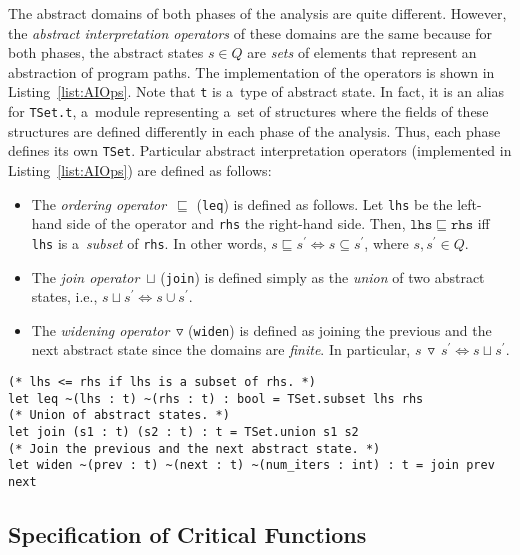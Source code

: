 The abstract domains of both phases of the analysis are quite different. However, the \emph{abstract interpretation operators} of these domains are the same because for both phases, the abstract states $ s \in Q $ are \emph{sets} of elements that represent an abstraction of program paths. The implementation of the operators is shown in Listing~\ref{list:AIOps}. Note that \texttt{t} is a~type of abstract state. In fact, it is an alias for \texttt{TSet.t}, a~module representing a~set of structures where the fields of these structures are defined differently in each phase of the analysis. Thus, each phase defines its own \texttt{TSet}. Particular abstract interpretation operators (implemented in Listing~\ref{list:AIOps}) are defined as follows:
\begin{itemize}
    \item The \emph{ordering operator}~$ \sqsubseteq $ (\texttt{leq}) is defined as follows. Let \texttt{lhs} be the left-hand side of the operator and \texttt{rhs} the right-hand side. Then, $ \mathtt{lhs} \sqsubseteq \mathtt{rhs} $ iff \texttt{lhs} is a~\emph{subset} of \texttt{rhs}. In other words, $ s \sqsubseteq s^\prime \Longleftrightarrow s \subseteq s^\prime $, where $ s, s^\prime \in Q $.

    \item The \emph{join operator}~$ \sqcup $ (\texttt{join}) is defined simply as the \emph{union} of two abstract states, i.e., $ s \sqcup s^\prime \Longleftrightarrow s \cup s^\prime $.

    \item The \emph{widening operator}~$ \triangledown $ (\texttt{widen}) is defined as joining the previous and the next abstract state since the domains are \emph{finite}. In particular, $ s\,\triangledown\,s^\prime \Longleftrightarrow s \sqcup s^\prime $.
\end{itemize}

\begin{lstlisting}[style=ocaml, label={list:AIOps}, float=hbt, caption={The implementation of the \emph{abstract interpretation operators}}]
(* lhs <= rhs if lhs is a subset of rhs. *)
let leq ~(lhs : t) ~(rhs : t) : bool = TSet.subset lhs rhs
(* Union of abstract states. *)
let join (s1 : t) (s2 : t) : t = TSet.union s1 s2
(* Join the previous and the next abstract state. *)
let widen ~(prev : t) ~(next : t) ~(num_iters : int) : t = join prev next
\end{lstlisting}

\subsection{Specification of Critical Functions}
\label{sec:implementFunIgnore}

